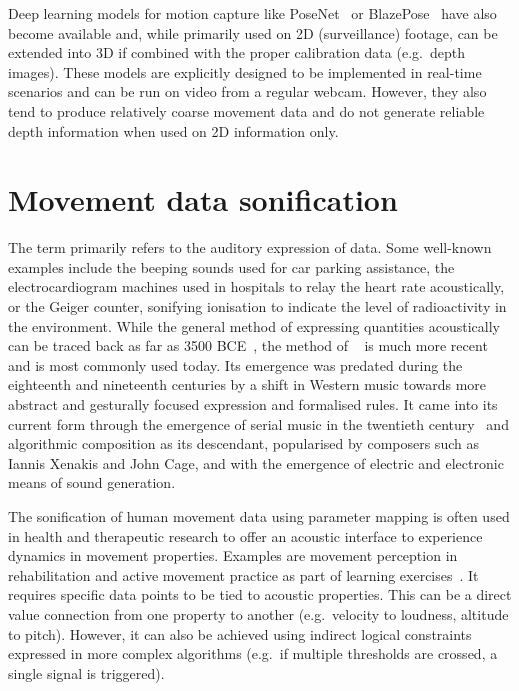 Deep learning models for motion capture like PoseNet~\parencite{kendall2016posenet} or BlazePose~\parencite{bazarevsky2020blazepose} have also become available and, while primarily used on \ac{2D} (surveillance) footage, can be extended into \ac{3D} if combined with the proper calibration data (e.g.\ depth images).
These models are explicitly designed to be implemented in real-time scenarios and can be run on video from a regular webcam.
However, they also tend to produce relatively coarse movement data and do not generate reliable depth information when used on \ac{2D} information only.

\section{Movement data sonification}
\label{sec:movement-data-sonification}

The term  primarily refers to the auditory expression of data.
Some well-known examples include the beeping sounds used for car parking assistance, the electrocardiogram machines used in hospitals to relay the heart rate acoustically, or the Geiger counter, sonifying ionisation to indicate the level of radioactivity in the environment.
While the general method of expressing quantities acoustically can be traced back as far as 3500 BCE~\parencite[178]{sonificationPreHistory}, the method of ~\parencite[Chapter~15]{sonificationHandbook} is much more recent and is most commonly used today.
Its emergence was predated during the eighteenth and nineteenth centuries by a shift in Western music towards more abstract and gesturally focused expression and formalised rules.
It came into its current form through the emergence of serial music in the twentieth century~\parencite[179-180]{sonificationPreHistory} and algorithmic composition as its descendant, popularised by composers such as Iannis Xenakis and John Cage, and with the emergence of electric and electronic means of sound generation.

The sonification of human movement data using parameter mapping is often used in health and therapeutic research to offer an acoustic interface to experience dynamics in movement properties.
Examples are movement perception in rehabilitation and active movement practice as part of learning exercises~\parencite[see][]{ifMotionSounds}.
It requires specific data points to be tied to acoustic properties.
This can be a direct value connection from one property to another (e.g.\ velocity to loudness, altitude to pitch).
However, it can also be achieved using indirect logical constraints expressed in more complex algorithms (e.g.\ if multiple thresholds are crossed, a single signal is triggered).

